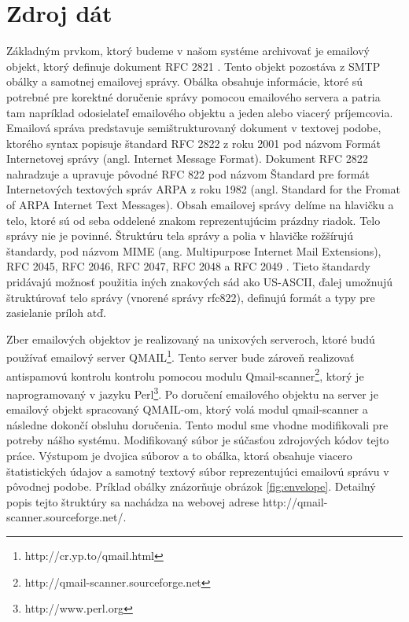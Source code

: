 \documentclass[11pt,twoside,a4paper]{book}
\begin{document}
\section{Zdroj dát}
Základným prvkom, ktorý budeme v našom systéme archivovať je emailový objekt, ktorý definuje dokument RFC 2821 \cite{}. Tento objekt pozostáva z SMTP obálky a samotnej emailovej správy. Obálka obsahuje informácie, ktoré sú potrebné pre korektné doručenie správy pomocou emailového servera a patria tam napríklad odosielateľ emailového objektu a jeden alebo viacerý príjemcovia. Emailová správa predstavuje semištrukturovaný dokument \cite{Udell} v textovej podobe, ktorého syntax popisuje štandard RFC 2822 \cite{Resnick:2001:IMF:RFC2822} z roku 2001 pod názvom Formát Internetovej správy (angl. Internet Message Format). Dokument RFC 2822 nahradzuje a upravuje pôvodné RFC 822 pod názvom Štandard pre formát Internetových textových správ ARPA z roku 1982 (angl. Standard for the Fromat of ARPA Internet Text Messages). Obsah emailovej správy delíme na hlavičku a telo, ktoré sú od seba oddelené znakom reprezentujúcim prázdny riadok. Telo správy nie je povinné. Štruktúru tela správy a polia v hlavičke rožšírujú štandardy, pod názvom MIME (ang. Multipurpose Internet Mail Extensions), RFC 2045, RFC 2046, RFC 2047, RFC 2048 a RFC 2049 \cite{}. Tieto štandardy pridávajú možnosť použitia iných znakových sád ako US-ASCII, ďalej umožnujú štruktúrovať telo správy (vnorené správy rfc822), definujú formát a typy pre zasielanie príloh atď.

Zber emailových objektov je realizovaný na unixových serveroch, ktoré budú používať emailový server QMAIL\footnote{http://cr.yp.to/qmail.html}. Tento server bude zároveň realizovať antispamovú kontrolu kontrolu pomocou modulu Qmail-scanner\footnote{http://qmail-scanner.sourceforge.net}, ktorý je naprogramovaný v jazyku Perl\footnote{http://www.perl.org}. Po doručení emailového objektu na server je emailový objekt spracovaný QMAIL-om, ktorý volá modul qmail-scanner a následne dokončí obsluhu doručenia. Tento modul sme vhodne modifikovali pre potreby nášho systému. Modifikovaný súbor je súčasťou zdrojových kódov tejto práce. Výstupom je dvojica súborov a to obálka, ktorá obsahuje viacero štatistických údajov a samotný textový súbor reprezentujúci emailovú správu v pôvodnej podobe. Príklad obálky znázorňuje obrázok \ref{fig:envelope}. Detailný popis tejto štruktúry sa nachádza na webovej adrese http://qmail-scanner.sourceforge.net/.
\end{document}
